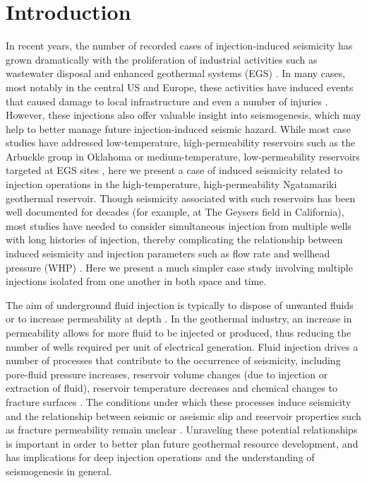 \section{Introduction} \label{Intro}
In recent years, the number of recorded cases of injection-induced seismicity has grown dramatically with the proliferation of industrial activities such as wastewater disposal and enhanced geothermal systems (EGS) \citep{Ellsworth_2013}. In many cases, most notably in the central US and Europe, these activities have induced events that caused damage to local infrastructure and even a number of injuries \citep[e.g.][]{Keranen_2013,Hsieh_1981,Deichmann_2009}. However, these injections also offer valuable insight into seismogenesis, which may help to better manage future injection-induced seismic hazard. While most case studies have addressed low-temperature, high-permeability reservoirs such as the Arbuckle group in Oklahoma \citep[e.g.][]{Langenbruch_2016} or medium-temperature, low-permeability reservoirs targeted at EGS sites \citep[e.g.][]{Deichmann_2009,Evans_2005}, here we present a case of induced seismicity related to injection operations in the high-temperature, high-permeability Ngatamariki geothermal reservoir. Though seismicity associated with such reservoirs has been well documented for decades (for example, at The Geysers field in California), most studies have needed to consider simultaneous injection from multiple wells with long histories of injection, thereby complicating the relationship between induced seismicity and injection parameters such as flow rate and wellhead pressure (WHP) \citep[e.g.][]{Allis_1982,Mart_nez_Garz_n_2014, Kwiatek_2015,Mart_nez_Garz_n_2017}. Here we present a much simpler case study involving multiple injections isolated from one another in both space and time.

The aim of underground fluid injection is typically to dispose of unwanted fluids or to increase permeability at depth \citep{Ellsworth_2013,Grant_2011}. In the geothermal industry, an increase in permeability allows for more fluid to be injected or produced, thus reducing the number of wells required per unit of electrical generation. Fluid injection drives a number of processes that contribute to the occurrence of seismicity, including pore-fluid pressure increases, reservoir volume changes (due to injection or extraction of fluid), reservoir temperature decreases and chemical changes to fracture surfaces \citep{Majer_2007}. The conditions under which these processes induce seismicity and the relationship between seismic or aseismic slip and reservoir properties such as fracture permeability remain unclear \citep[][and references therein]{Amann_2018,Das_2011}. Unraveling these potential relationships is important in order to better plan future geothermal resource development, and has implications for deep injection operations and the understanding of seismogenesis in general.

